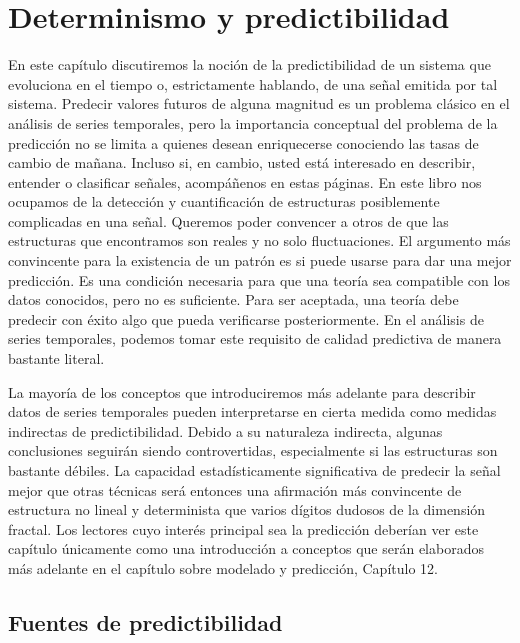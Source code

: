 \documentclass[10pt,a4paper]{book}
\begin{document}
\newpage

\chapter{Determinismo y predictibilidad}

En este capítulo discutiremos la noción de la predictibilidad de un sistema que evoluciona en el tiempo o, estrictamente hablando, de una señal emitida por tal sistema. Predecir valores futuros de alguna magnitud es un problema clásico en el análisis de series temporales, pero la importancia conceptual del problema de la predicción no se limita a quienes desean enriquecerse conociendo las tasas de cambio de mañana. Incluso si, en cambio, usted está interesado en describir, entender o clasificar señales, acompáñenos en estas páginas. En este libro nos ocupamos de la detección y cuantificación de estructuras posiblemente complicadas en una señal. Queremos poder convencer a otros de que las estructuras que encontramos son reales y no solo fluctuaciones. El argumento más convincente para la existencia de un patrón es si puede usarse para dar una mejor predicción. Es una condición necesaria para que una teoría sea compatible con los datos conocidos, pero no es suficiente. Para ser aceptada, una teoría debe predecir con éxito algo que pueda verificarse posteriormente. En el análisis de series temporales, podemos tomar este requisito de calidad predictiva de manera bastante literal.

\bigskip

La mayoría de los conceptos que introduciremos más adelante para describir datos de series temporales pueden interpretarse en cierta medida como medidas indirectas de predictibilidad. Debido a su naturaleza indirecta, algunas conclusiones seguirán siendo controvertidas, especialmente si las estructuras son bastante débiles. La capacidad estadísticamente significativa de predecir la señal mejor que otras técnicas será entonces una afirmación más convincente de estructura no lineal y determinista que varios dígitos dudosos de la dimensión fractal. Los lectores cuyo interés principal sea la predicción deberían ver este capítulo únicamente como una introducción a conceptos que serán elaborados más adelante en el capítulo sobre modelado y predicción, Capítulo 12.

\section{Fuentes de predictibilidad}
\end{document}
